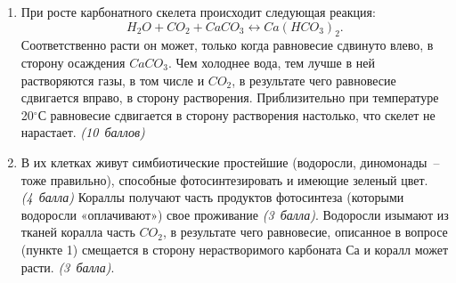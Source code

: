 \solutionSection
\begin{enumerate}
    \item При росте карбонатного скелета происходит следующая реакция:
    $$H_2O+CO_2+CaCO_3 \leftrightarrow Ca(HCO_3)_2.$$ Соответственно расти он может, только когда равновесие 
    сдвинуто влево, в сторону осаждения $CaCO_3$. Чем холоднее вода, тем лучше в ней растворяются газы, в 
    том числе и $CO_2$, в результате чего равновесие сдвигается вправо, в сторону растворения. Приблизительно 
    при температуре 20$^{\circ}$С равновесие сдвигается в сторону растворения настолько, что скелет не нарастает. 
    \textit{(10~баллов)}
    \item В их клетках живут симбиотические простейшие (водоросли, диномонады~– тоже правильно), способные 
    фотосинтезировать и имеющие зеленый цвет. \textit{(4~балла)} Кораллы получают часть продуктов фотосинтеза 
    (которыми водоросли «оплачивают») свое проживание \textit{(3~балла)}. Водоросли изымают из тканей коралла 
    часть $CO_2$, в результате чего равновесие, описанное в вопросе (пункте 1) смещается в сторону нерастворимого 
    карбоната $Са$ и коралл может расти. \textit{(3~балла)}.
    \end{enumerate}
